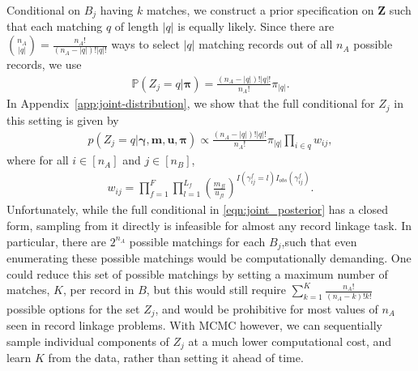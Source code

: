 \documentclass[12pt,letterpaper]{article}
\newcommand{\1}[1]{\mathbb{I}\!\left[#1\right]} %
\begin{document}
Conditional on $B_j$ having $k$ matches, we construct a prior specification on $\bm{Z}$ such that each matching $q$ of length $|q|$ is equally likely. Since there are ${n_A \choose |q|} = \frac{n_A!}{(n_A - |q|)! |q|!}$ ways to select $|q|$ matching records out of all $n_A$ possible records, we use
\begin{align} \label{eqn:drl-prior}
	\mathbb{P}(Z_j = q| \bm{\pi}) = \frac{(n_A - |q|)! |q|!}{n_A!} \pi_{|q|}. 
\end{align}
In Appendix~\ref{app:joint-distribution}, we show that the full conditional for $Z_j$ in this setting is given by
\begin{align} \label{eqn:joint_posterior}
		p\left(Z_j  = q|\bm{\gamma}, \bm{m}, \bm{u}, \bm{\pi} \right) \propto \frac{(n_A - |q|)!|q|!}{n_A!} \pi_{|q|} \prod_{i \in q} w_{ij}, 
\end{align}
where for all $i \in [n_A]$ and $j \in [n_B]$, 
\begin{align*}
	w_{ij} = \prod_{f=1}^{F}\prod_{l = 1}^{L_f} \left(\frac{m_{fl}}{u_{fl}}\right)^{I(\gamma_{ij}^f = l)I_{obs}(\gamma_{ij}^f)} .
\end{align*}
Unfortunately, while the full conditional in \eqref{eqn:joint_posterior} has a closed form, sampling from it directly is infeasible for almost any record linkage task. In particular, there are $2^{n_A}$ possible matchings for each $B_j$,such that even enumerating these possible matchings would be computationally demanding. One could reduce this set of possible matchings by setting a maximum number of matches, $K$, per record in $B$, but this would still require $\sum_{k = 1}^K \frac{n_A!}{(n_A - k)!k!}$ possible options for the set $Z_j$, and would be prohibitive for most values of $n_A$ seen in record linkage problems. With MCMC however, we can sequentially sample individual components of $Z_j$ at a much lower computational cost, and learn $K$ from the data, rather than setting it ahead of time. 

\end{document}
